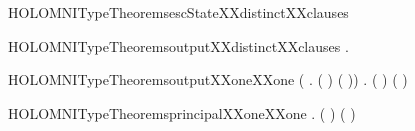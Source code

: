 \newcommand{\HOLOMNITypeTheoremsescOutputXXdistinctXXclauses}{\UseVerbatim{HOLOMNITypeTheoremsescOutputXXdistinctXXclauses}}
\begin{SaveVerbatim}{HOLOMNITypeTheoremsescStateXXdistinctXXclauses}
\HOLTokenTurnstile{}  \HOLSymConst{\HOLTokenNotEqual{}}  \HOLSymConst{\HOLTokenConj{}}  \HOLSymConst{\HOLTokenNotEqual{}}  \HOLSymConst{\HOLTokenConj{}}  \HOLSymConst{\HOLTokenNotEqual{}}  \HOLSymConst{\HOLTokenConj{}}  \HOLSymConst{\HOLTokenNotEqual{}}  \HOLSymConst{\HOLTokenConj{}}
    \HOLSymConst{\HOLTokenNotEqual{}}  \HOLSymConst{\HOLTokenConj{}}  \HOLSymConst{\HOLTokenNotEqual{}} 
\end{SaveVerbatim}
\newcommand{\HOLOMNITypeTheoremsescStateXXdistinctXXclauses}{\UseVerbatim{HOLOMNITypeTheoremsescStateXXdistinctXXclauses}}
\begin{SaveVerbatim}{HOLOMNITypeTheoremsoutputXXdistinctXXclauses}
\HOLTokenTurnstile{} \HOLSymConst{\HOLTokenForall{}} .   \HOLSymConst{\HOLTokenNotEqual{}}  
\end{SaveVerbatim}
\newcommand{\HOLOMNITypeTheoremsoutputXXdistinctXXclauses}{\UseVerbatim{HOLOMNITypeTheoremsoutputXXdistinctXXclauses}}
\begin{SaveVerbatim}{HOLOMNITypeTheoremsoutputXXoneXXone}
\HOLTokenTurnstile{} (\HOLSymConst{\HOLTokenForall{}} . (  \HOLSymConst{=}  ) \HOLSymConst{\HOLTokenEquiv{}} ( \HOLSymConst{=} )) \HOLSymConst{\HOLTokenConj{}}
   \HOLSymConst{\HOLTokenForall{}} . (  \HOLSymConst{=}  ) \HOLSymConst{\HOLTokenEquiv{}} ( \HOLSymConst{=} )
\end{SaveVerbatim}
\newcommand{\HOLOMNITypeTheoremsoutputXXoneXXone}{\UseVerbatim{HOLOMNITypeTheoremsoutputXXoneXXone}}
\begin{SaveVerbatim}{HOLOMNITypeTheoremsprincipalXXoneXXone}
\HOLTokenTurnstile{} \HOLSymConst{\HOLTokenForall{}} . (  \HOLSymConst{=}  ) \HOLSymConst{\HOLTokenEquiv{}} ( \HOLSymConst{=} )
\end{SaveVerbatim}
